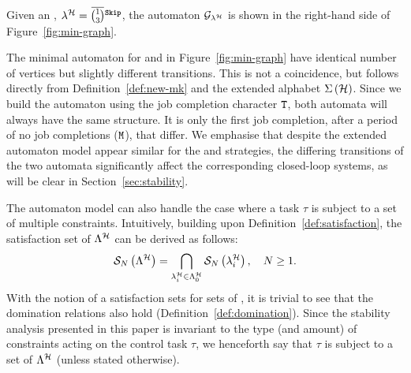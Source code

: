 \begin{example}%
    \label{ex:auto-skip}%
    Given an \ewhc{}, $\lambda^{\strat} = \overbar{\binom{1}{3}}^{\tS{}}$, the automaton $\mathcal{G}_{\lambda^{\mathcal{H}}}$ is shown in the right-hand side of Figure~\ref{fig:min-graph}.
\end{example}

The minimal automaton for \tK{} and \tS{} in Figure~\ref{fig:min-graph} have identical number of vertices but slightly different transitions.
This is not a coincidence, but follows directly from Definition~\ref{def:new-mk} and the extended alphabet $\Sigma\left(\mathcal{H}\right)$.
Since we build the automaton using the job completion character $\texttt{T}$, both automata will always have the same structure.
It is only the first job completion, after a period of no job completions ($\texttt{M}$), that differ.
We emphasise that despite the extended automaton model appear similar for the \tK{} and \tS{} strategies, the differing transitions of the two automata significantly affect the corresponding closed-loop systems, as will be clear in Section~\ref{sec:stability}.

The \tool{} automaton model can also handle the case where a task $\tau$ is subject to a set of multiple constraints.
Intuitively, building upon Definition~\ref{def:satisfaction}, the satisfaction set of $\Lambda^{\mathcal{H}}$ can be derived as follows:
%
\begin{equation}
    \label{eq:satisfaction-multi}
    \sset{N}{\Lambda^{\strat}} = \bigcap_{\lambda^{\strat}_i \in \Lambda^{\strat}_0} \sset{N}{\lambda^{\strat}_i}, \quad N \geq 1.
\end{equation}
%
With the notion of a satisfaction sets for sets of \ewhc{}, it is trivial to see that the domination relations also hold (Definition~\ref{def:domination}).
Since the stability analysis presented in this paper is invariant to the type (and amount) of constraints acting on the control task $\tau$, we henceforth say that $\tau$ is subject to a set of \ewhc{} $\Lambda^{\mathcal{H}}$ (unless stated otherwise).


